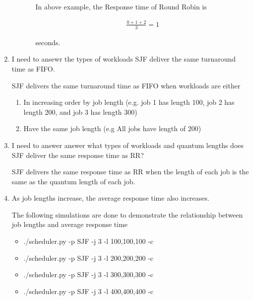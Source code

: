 \documentclass[12pt]{article}
\begin{document}
\begin{enumerate}[1.]
\begin{itemize}
\begin{itemize}
            In above example, the Response time of Round Robin is

            \begin{align}
                \frac{0 + 1 + 2}{3} = 1
            \end{align}

            seconds.
        \end{itemize}
    \end{itemize}

    \item

    I need to ansewr the types of workloads SJF deliver the same turnaround time as FIFO.

    \bigskip

    SJF delivers the same turnaround time as FIFO when workloads are either

    \begin{enumerate}[1.]
        \item In increasing order by job length (e.g. job 1 has length 100, job 2 has length 200, and job 3 has length 300)
        \item Have the same job length (e.g All jobs have length of 200)
    \end{enumerate}

    \item

    I need to answer answer what types of workloads and quantum lengths does SJF deliver the same response
    time as RR?

    \bigskip

    SJF delivers the same response time as RR when the length of each job is the same
    as the quantum length of each job.

    \item

    As job lengths increase, the average response time also increases.

    \bigskip

    The following simulations are done to demonstrate the relationship between
    job lengths and average response time

    \begin{itemize}
        \item ./scheduler.py -p SJF -j 3 -l 100,100,100 -c
        \item ./scheduler.py -p SJF -j 3 -l 200,200,200 -c
        \item ./scheduler.py -p SJF -j 3 -l 300,300,300 -c
        \item ./scheduler.py -p SJF -j 3 -l 400,400,400 -c
    \end{itemize}


\end{enumerate}
\end{document}
